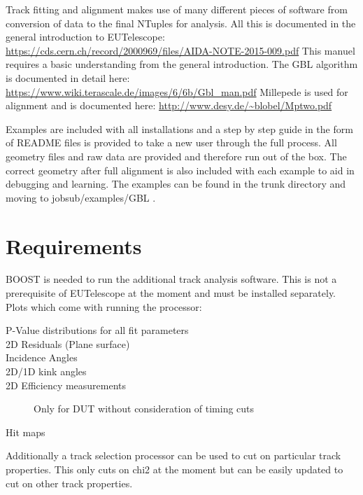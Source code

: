 Track fitting and alignment makes use of many different pieces of software from conversion of data to the final NTuples for analysis. All this is documented in the general introduction to EUTelescope:
\newline
\url{https://cds.cern.ch/record/2000969/files/AIDA-NOTE-2015-009.pdf}
\newline
This manuel requires a basic understanding from the general introduction. The GBL algorithm is documented in detail here:
\newline	
\url{https://www.wiki.terascale.de/images/6/6b/Gbl_man.pdf}
\newline
Millepede is used for alignment and is documented here:
\newline
\url{http://www.desy.de/~blobel/Mptwo.pdf}
\newline


Examples are included with all installations and a step by step guide in the form of README files is provided to take a new user through the full process. All geometry files and raw data are provided and therefore run out of the box. The correct geometry after full alignment is also included with each example to aid in debugging and learning.  The examples can be found in the trunk directory and moving to jobsub/examples/GBL .

\section{Requirements}
BOOST is needed to run the additional track analysis software. This is not a prerequisite of EUTelescope at the moment and must be installed separately. Plots which come with running the processor:

\begin{description} 
\item[P-Value distributions for all fit parameters] 
\item[2D Residuals (Plane surface)] 
\item[Incidence Angles] 
\item[2D/1D kink angles] 
\item[2D Efficiency measurements] Only for DUT without consideration of timing cuts
\item[Hit maps] 
\end{description} 

Additionally a track selection processor can be used to cut on particular track properties. This only cuts on chi2 at the moment but can be easily updated to cut on other track properties. 


